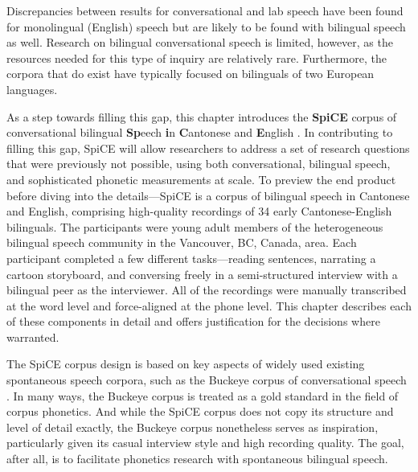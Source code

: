 Discrepancies between results for conversational and lab speech have been found for monolingual (English) speech but are likely to be found with bilingual speech as well. Research on bilingual conversational speech is limited, however, as the resources needed for this type of inquiry are relatively rare. Furthermore, the corpora that do exist have typically focused on bilinguals of two European languages.

As a step towards filling this gap, this chapter introduces the \textbf{SpiCE} corpus of conversational bilingual \textbf{Sp}eech \textbf{i}n \textbf{C}antonese and \textbf{E}nglish \citep{johnson_2021_spice}. In contributing to filling this gap, SpiCE will allow researchers to address a set of research questions that were previously not possible, using both conversational, bilingual speech, and sophisticated phonetic measurements at scale. To preview the end product before diving into the details---SpiCE is a corpus of bilingual speech in Cantonese and English, comprising high-quality recordings of 34 early Cantonese-English bilinguals. The participants were young adult members of the heterogeneous bilingual speech community in the Vancouver, BC, Canada, area. Each participant completed a few different tasks—reading sentences, narrating a cartoon storyboard, and conversing freely in a semi-structured interview with a bilingual peer as the interviewer. All of the recordings were manually transcribed at the word level and force-aligned at the phone level. This chapter describes each of these components in detail and offers justification for the decisions where warranted.

The SpiCE corpus design is based on key aspects of widely used existing spontaneous speech corpora, such as the Buckeye corpus of conversational speech \citep{pitt_2005_buckeye}. In many ways, the Buckeye corpus is treated as a gold standard in the field of corpus phonetics. And while the SpiCE corpus does not copy its structure and level of detail exactly, the Buckeye corpus nonetheless serves as inspiration, particularly given its casual interview style and high recording quality. The goal, after all, is to facilitate phonetics research with spontaneous bilingual speech. 

